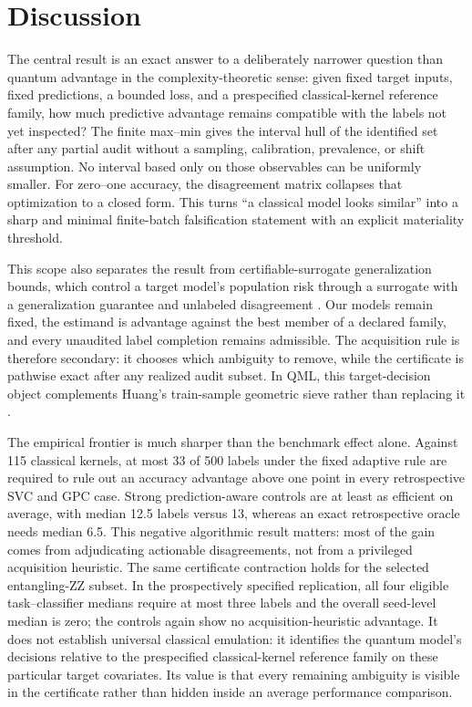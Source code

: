 \documentclass[referee,lineno,pdflatex,sn-vancouver-num]{sn-jnl}
\theoremstyle{thmstyleone}%
\theoremstyle{thmstyletwo}%
\theoremstyle{thmstylethree}%
\begin{document}
\section{Discussion}
\label{sec:discussion}

The central result is an exact answer to a deliberately narrower question than quantum advantage in the complexity-theoretic sense: given fixed target inputs, fixed predictions, a bounded loss, and a prespecified classical-kernel reference family, how much predictive advantage remains compatible with the labels not yet inspected? The finite max--min gives the interval hull of the identified set after any partial audit without a sampling, calibration, prevalence, or shift assumption. No interval based only on those observables can be uniformly smaller. For zero--one accuracy, the disagreement matrix collapses that optimization to a closed form. This turns ``a classical model looks similar'' into a sharp and minimal finite-batch falsification statement with an explicit materiality threshold.

This scope also separates the result from certifiable-surrogate generalization bounds, which control a target model's population risk through a surrogate with a generalization guarantee and unlabeled disagreement \cite{bazinet2026bound}. Our models remain fixed, the estimand is advantage against the best member of a declared family, and every unaudited label completion remains admissible. The acquisition rule is therefore secondary: it chooses which ambiguity to remove, while the certificate is pathwise exact after any realized audit subset. In QML, this target-decision object complements Huang's train-sample geometric sieve rather than replacing it \cite{huang2021powerofdata}.

The empirical frontier is much sharper than the benchmark effect alone. Against 115 classical kernels, at most 33 of 500 labels under the fixed adaptive rule are required to rule out an accuracy advantage above one point in every retrospective SVC and GPC case. Strong prediction-aware controls are at least as efficient on average, with median 12.5 labels versus 13, whereas an exact retrospective oracle needs median 6.5. This negative algorithmic result matters: most of the gain comes from adjudicating actionable disagreements, not from a privileged acquisition heuristic. The same certificate contraction holds for the selected entangling-ZZ subset. In the prospectively specified replication, all four eligible task--classifier medians require at most three labels and the overall seed-level median is zero; the controls again show no acquisition-heuristic advantage. It does not establish universal classical emulation: it identifies the quantum model's decisions relative to the prespecified classical-kernel reference family on these particular target covariates. Its value is that every remaining ambiguity is visible in the certificate rather than hidden inside an average performance comparison.
\end{document}
